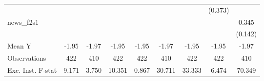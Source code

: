 {\begin{tabular}{l*{8}{c}}
            &                     &                     &                     &                     &                     &                     &     (0.373)         &                     \\
\addlinespace
news\_f2s1   &                     &                     &                     &                     &                     &                     &                     &       0.345\sym{**} \\
            &                     &                     &                     &                     &                     &                     &                     &     (0.142)         \\
\midrule
Mean Y      &       -1.95         &       -1.97         &       -1.95         &       -1.95         &       -1.97         &       -1.95         &       -1.95         &       -1.97         \\
Observations&         422         &         410         &         422         &         422         &         410         &         422         &         422         &         410         \\
Exc. Inst. F-stat&       9.171         &       3.750         &      10.351         &       0.867         &      30.711         &      33.333         &       6.474         &      70.349         \\
\bottomrule
\end{tabular}
}
